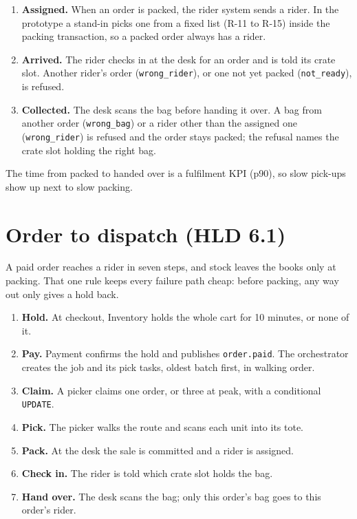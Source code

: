 \begin{enumerate}
  \item \textbf{Assigned.} When an order is packed, the rider system sends a rider. In the prototype a stand-in picks
    one from a fixed list (R-11 to R-15) inside the packing transaction, so a packed order always has a rider.
  \item \textbf{Arrived.} The rider checks in at the desk for an order and is told its crate slot. Another rider's
    order (\texttt{wrong\_rider}), or one not yet packed (\texttt{not\_ready}), is refused.
  \item \textbf{Collected.} The desk scans the bag before handing it over. A bag from another order
    (\texttt{wrong\_bag}) or a rider other than the assigned one (\texttt{wrong\_rider}) is refused and the order
    stays packed; the refusal names the crate slot holding the right bag.
\end{enumerate}

The time from packed to handed over is a fulfilment KPI (p90), so slow pick-ups show up next to slow packing.

\section{Order to dispatch (HLD 6.1)}

A paid order reaches a rider in seven steps, and stock leaves the books only at packing. That one rule keeps every
failure path cheap: before packing, any way out only gives a hold back.

\begin{enumerate}
  \item \textbf{Hold.} At checkout, Inventory holds the whole cart for 10 minutes, or none of it.
  \item \textbf{Pay.} Payment confirms the hold and publishes \texttt{order.paid}. The orchestrator creates the job
    and its pick tasks, oldest batch first, in walking order.
  \item \textbf{Claim.} A picker claims one order, or three at peak, with a conditional \texttt{UPDATE}.
  \item \textbf{Pick.} The picker walks the route and scans each unit into its tote.
  \item \textbf{Pack.} At the desk the sale is committed and a rider is assigned.
  \item \textbf{Check in.} The rider is told which crate slot holds the bag.
  \item \textbf{Hand over.} The desk scans the bag; only this order's bag goes to this order's rider.
\end{enumerate}

